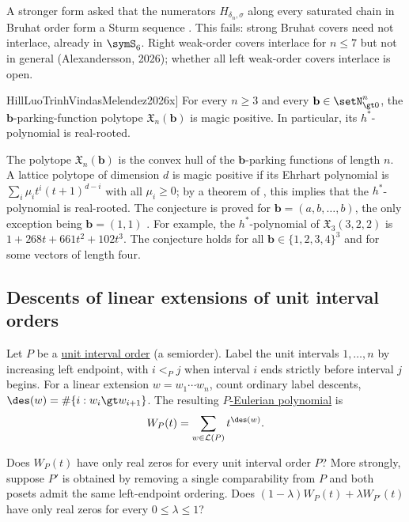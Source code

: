 A stronger form asked that the numerators $H_{\delta_n,\sigma}$ along every
saturated chain in Bruhat order form a Sturm sequence
\cite[Conj.~6.4]{GaoLiuYangZhao2026x}.  This fails: strong Bruhat covers
need not interlace, already in $\symS_6$.  Right weak-order covers
interlace for $n\leq7$ but not in general (Alexandersson, 2026); whether
all left weak-order covers interlace is open.

\begin{conjecture}[Hill--Luo--Trinh--Vindas-Meléndez,
\cite[Conj.~8.1]{HillLuoTrinhVindasMelendez2026x}]
\label{conjParkingPolytopeMagic}
For every $n\geq3$ and every $\mathbf{b}\in\setN_{\gt0}^n$, the
$\mathbf{b}$-parking-function polytope $\mathfrak{X}_n(\mathbf{b})$ is magic
positive.  In particular, its $h^*$-polynomial is real-rooted.
\end{conjecture}

The polytope $\mathfrak{X}_n(\mathbf{b})$ is the convex hull of the
$\mathbf{b}$-parking functions of length $n$.  A lattice polytope of
dimension $d$ is magic positive if its Ehrhart polynomial is
$\sum_i\mu_it^i(t+1)^{d-i}$ with all $\mu_i\geq0$; by a theorem of
, this implies that the $h^*$-polynomial is
real-rooted.  The conjecture is proved for $\mathbf{b}=(a,b,\dotsc,b)$,
the only exception being $\mathbf{b}=(1,1)$
\cite[Thm.~7.2 and Cor.~7.12]{HillLuoTrinhVindasMelendez2026x}.  For
example, the $h^*$-polynomial of $\mathfrak{X}_3(3,2,2)$ is
$1+268t+661t^2+102t^3$.  The conjecture holds for all
$\mathbf{b}\in\{1,2,3,4\}^3$ and for some vectors of length four.


\subsection[semiorderEulerianZeros]{Descents of linear extensions of unit interval orders}

Let $P$ be a \hyperref[unitIntervalOrder]{unit interval order} (a semiorder).
Label the unit intervals $1,\ldots,n$ by increasing left endpoint, with
$i\lt_P j$ when interval $i$ ends strictly before interval $j$ begins.
For a linear extension $w=w_1\cdots w_n$, count ordinary label descents,
$\des(w)=\#\{i:w_i\gt w_{i+1}\}$.  The resulting
\hyperref[pEulerianPolynomial]{$P$-Eulerian polynomial} is
\[
  W_P(t)=\sum_{w\in\mathcal{L}(P)}t^{\des(w)}.
\]

\begin{problem}
Does $W_P(t)$ have only real zeros for every unit interval order $P$?
More strongly, suppose $P'$ is obtained by removing a single
comparability from $P$ and both posets admit the same left-endpoint
ordering.  Does $(1-\lambda)W_P(t)+\lambda W_{P'}(t)$ have only real
zeros for every $0\leq\lambda\leq1$?
\end{problem}

